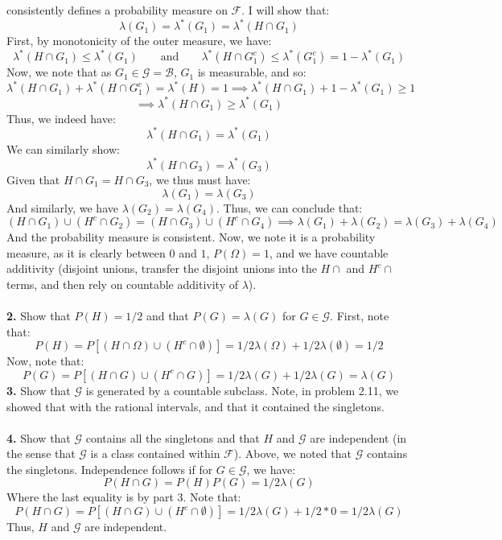 \documentclass[12pt,a4paper]{article}
\newcommand{\1}[1]{\mathbbm{1}\left\{ #1 \right\}}
\newcommand{\fcal}{\mathcal{F}}
\newcommand{\bcal}{\mathcal{B}}
\newcommand{\gcal}{\mathcal{G}}
\begin{document}
consistently defines a probability measure on $\fcal$. I will show that:
$$
	\lambda(G_1) = \lambda^*(G_1) = \lambda^*(H \cap G_1)
$$
First, by monotonicity of the outer measure, we have:
$$
	\lambda^*(H \cap G_1) \leq \lambda^*(G_1) \quad\quad\text{and}\quad\quad
	\lambda^*(H \cap G_1^c) \leq \lambda^*(G_1^c) = 1 - \lambda^*(G_1)
$$
Now, we note that as $G_1 \in \gcal = \bcal$, $G_1$ is measurable, and so:
$$
	\lambda^*(H \cap G_1) + \lambda^*(H \cap G_1^c) = \lambda^*(H) = 1 \implies
	\lambda^*(H \cap G_1) + 1 - \lambda^*(G_1) \geq 1
$$
$$
	\implies \lambda^*(H \cap G_1) \geq \lambda^*(G_1)
$$
Thus, we indeed have:
$$
	\lambda^*(H \cap G_1) = \lambda^*(G_1)
$$
We can similarly show:
$$
	\lambda^*(H \cap G_3) = \lambda^*(G_3)
$$
Given that $H \cap G_1 = H \cap G_3$, we thus must have:
$$
	\lambda(G_1) = \lambda(G_3)
$$
And similarly, we have $\lambda(G_2) = \lambda(G_4)$. Thus, we can conclude that:
$$
	(H \cap G_1) \cup (H^c \cap G_2) = (H \cap G_3) \cup (H^c \cap G_4) \implies
	\lambda(G_1) + \lambda(G_2) = \lambda(G_3) + \lambda(G_4)
$$
And the probability measure is consistent. Now, we note it is a probability measure, as it is clearly between $0$ and $1$, $P(\Omega) = 1$, and we have countable additivity (disjoint unions, transfer the disjoint unions into the $H \cap$ and $H^c \cap$ terms, and then rely on countable additivity of $\lambda$).
\\\\
\textbf{2.} Show that $P(H) = 1/2$ and that $P(G) = \lambda(G)$ for $G \in \gcal$. First, note that:
$$
	P(H) = P\left[(H \cap \Omega) \cup (H^c \cap \emptyset)\right] =
	1/2\lambda(\Omega) + 1/2\lambda(\emptyset) = 1/2
$$
Now, note that:
$$
	P(G) = P\left[(H \cap G) \cup (H^c \cap G)\right] =
	1/2\lambda(G) + 1/2\lambda(G) = \lambda(G)
$$
\textbf{3.} Show that $\gcal$ is generated by a countable subclass. Note, in problem 2.11, we showed that with the rational intervals, and that it contained the singletons.
\\\\
\textbf{4.} Show that $\gcal$ contains all the singletons and that $H$ and $\gcal$ are independent (in the sense that $\gcal$ is a class contained within $\fcal$). Above, we noted that $\gcal$ contains the singletons. Independence follows if for $G \in \gcal$, we have:
$$
	P(H \cap G) = P(H)P(G) = 1/2\lambda(G)
$$
Where the last equality is by part 3. Note that:
$$
	P(H \cap G) = P\left[(H \cap G) \cup (H^c \cap \emptyset)\right] = 1/2\lambda(G) + 1/2* 0 = 1/2\lambda(G)
$$
Thus, $H$ and $\gcal$ are independent.
\\\\
\end{document}
